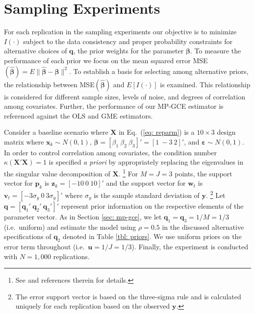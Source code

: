 \documentclass{elsarticle}
\begin{document}
\section{Sampling Experiments}
\label{sec: mce}

For each replication in the sampling experiments our objective is to minimize 
$I(\cdot)$ subject to the data consistency and proper probability constraints 
for alternative choices of $\mathbf{q}$, the prior weights for the parameter 
$\mathbf{\beta}$. 
To measure the performance of each prior we focus on the mean squared 
error MSE$(\hat{\mathbf{\beta}}) = E \| \hat{\mathbf{\beta}}- 
\mathbf{\beta}\|^2$.
To establish a basis for selecting among alternative priors, the relationship 
between MSE$(\hat{\mathbf{\beta}})$ and $E[I(\cdot)]$ is examined.
This relationship is considered for different sample sizes, levels of noise, 
and degrees of correlation among covariates.
Further, the performance of our MP-GCE estimator is referenced 
against the OLS and GME estimators.

Consider a baseline scenario where $\mathbf{X}$ in Eq.\ (\ref{eq: reparm})
is a $10 \times 3$ design matrix where $\mathbf{x}_k \sim 
N(0,1)$, $\mathbf{\beta}= [\beta_1 ~ \beta_2 ~ \beta_3]'=[1 ~ -3 ~ 2]'$, 
and $\mathbf{\varepsilon} \sim N(0,1)$.
In order to control correlation among covariates, the condition
number $\kappa(\mathbf{X}'\mathbf{X})=1$ is specified \textit{a priori}
by appropriately replacing the eigenvalues in the singular value 
decomposition of $\mathbf{X}$.%
\footnote{See \citet[pg.\ 133]{golan1996} and references therein for 
details.}
For $M=J=3$ points, the support vector for $\mathbf{p}_k$ is 
$\mathbf{z}_k = [- 10 ~ 0 ~ 10]'$ and the support vector for $\mathbf{w}_t$ 
is $\mathbf{v}_t = [- 3\sigma_y ~ 0 ~ 3\sigma_y]'$ where $\sigma_y$ is the sample
standard deviation of $\mathbf{y}$.%
\footnote{The error support vector is based on the three-sigma
rule \citep{pukelsheim1994} and is calculated 
uniquely for each replication based on the observed $\mathbf{y}$.}
Let $\mathbf{q} = [\mathbf{q}_1' ~ 
\mathbf{q}_2' ~ \mathbf{q}_3']'$ represent prior information on the 
respective elements of the parameter vector.
As in Section \ref{sec: mp-gce}, we let $\mathbf{q}_1 = \mathbf{q}_3 = 1/M 
= 1/3$ (i.e.\ uniform) and estimate the model using $\rho=0.5$  in the 
discussed alternative specifications of $\mathbf{q}_2$ denoted in Table \ref{tbl: priors}.
We use uniform priors on the error term throughout (i.e.\ $\mathbf{u} = 1/J = 1/3$).
Finally, the experiment is conducted with $N=1,000$ replications.
\end{document}
